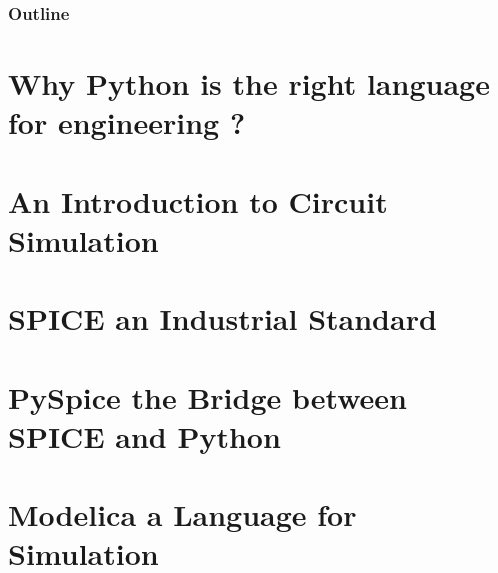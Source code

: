 
\begin{frame}
  \frametitle{Outline}
  \tableofcontents
\end{frame}

%
%

% 

\section{Why Python is the right language for engineering ?}


\section{An Introduction to Circuit Simulation}


\section{SPICE an Industrial Standard}



\section{PySpice the Bridge between SPICE and Python}



\section{Modelica a Language for Simulation}








